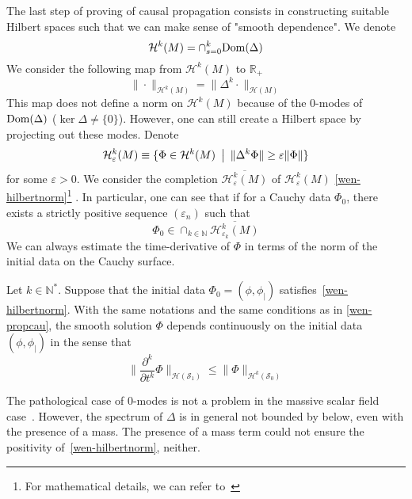 %
The last step of proving of causal propagation consists in constructing suitable Hilbert spaces such that we can make sense of "smooth dependence". 
We denote 
\begin{equation*}
\mathcal{H}^k(M) = \cap_{s=0}^{k} \mathrm{Dom}(\Delta)
\end{equation*}
We consider the following map from $\mathcal{H}^k(M)$ to $\mathbb{R}_+$
\begin{equation}\label{wen-hilbertnorm}
\| \cdot \|_{\mathcal{H}^k(M)} = \| \Delta^k \cdot \|_{\mathcal{H}(M)}
\end{equation}
This map does not define a norm on $\mathcal{H}^k(M)$ because of the 0-modes of $\mathrm{Dom}(\Delta)$ ($\ker \Delta \neq \{0\}$).
However, one can still create a Hilbert space by projecting out these modes.
Denote
\begin{equation*}
\mathcal{H}_\varepsilon^k(M) \equiv
\{ \Phi \in \mathcal{H}^k(M) \enskip\big\vert\enskip \| \Delta^k \Phi\| \geq \varepsilon \| \Phi\| \}
\end{equation*}
for some $\varepsilon > 0 $.
We consider the completion $\overline{\mathcal{H}_\varepsilon^k(M)}$ of
$\mathcal{H}_\varepsilon^k(M)$ \wrt\cref{wen-hilbertnorm}\footnote{
For mathematical details, we can refer to~\cite{Reed1981}
}
. 
In particular, one can see that if for a Cauchy data $\Phi_0$,
there exists a strictly positive sequence $(\varepsilon_n)$ such that 
\begin{equation}\label{wen-nozeromode} 
\Phi_0\in \cap_{k\in\mathbb{N}}\overline{\mathcal{H}^k_{\varepsilon_k}(M) }
\end{equation}
We can always estimate the time-derivative of $\Phi$ in terms of the norm of the initial data on the Cauchy surface.
\begin{proposition}
Let $k \in \mathbb{N}^*$.
Suppose that the initial data $\Phi_0 = (\phi, \phi_|)$ satisfies~\cref{wen-hilbertnorm}.
With the same notations and the same conditions as in \cref{wen-propcau}, 
the smooth solution $\Phi$ depends continuously on the initial data $(\phi, \phi_|)$ in the sense that
\begin{equation*}
\big\| \frac{\partial^k}{\partial t^k} \Phi\big\|_{\mathcal{H}(\mathcal{S}_1)}
\leq
\big\| \Phi\big\|_{\mathcal{H}^{k}(\mathcal{S}_0)}
\end{equation*}
\end{proposition}
%
\begin{remark}
The pathological case of 0-modes is not a problem in the massive scalar field case~\cite{Zahn2016}. 
However, the spectrum of $\Delta$ is in general not bounded by below, even with the presence of a mass.
The presence of a mass term could not ensure the positivity of~\cref{wen-hilbertnorm}, neither. 
\end{remark}
